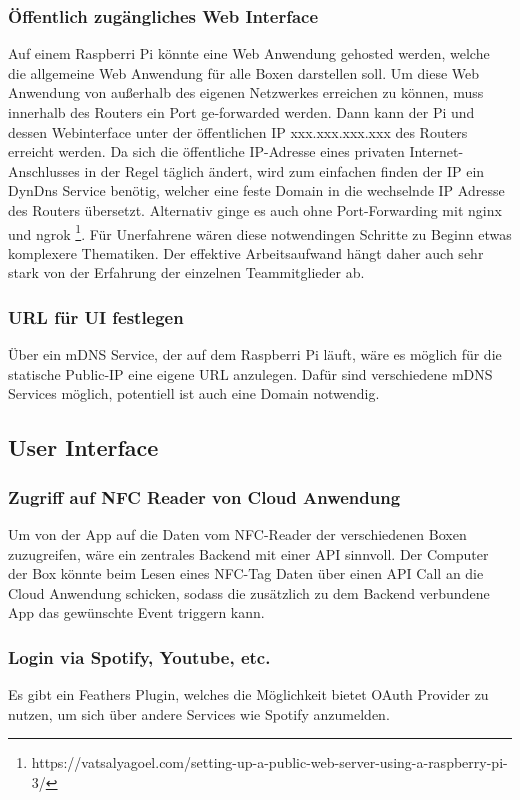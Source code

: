\documentclass[10pt, a4paper]{article}
\begin{document}
\subsubsection{Öffentlich zugängliches Web Interface}
Auf einem Raspberri Pi könnte eine Web Anwendung gehosted werden, welche die allgemeine Web Anwendung für alle Boxen darstellen soll.
Um diese Web Anwendung von außerhalb des eigenen Netzwerkes erreichen zu können, muss innerhalb des Routers ein Port ge-forwarded werden.
Dann kann der Pi und dessen Webinterface unter der öffentlichen IP xxx.xxx.xxx.xxx des Routers erreicht werden.
Da sich die öffentliche IP-Adresse eines privaten Internet-Anschlusses in der Regel täglich ändert, wird zum einfachen finden der IP ein DynDns Service benötig, welcher eine feste Domain in die wechselnde IP Adresse des Routers übersetzt.
Alternativ ginge es auch ohne Port-Forwarding mit nginx und ngrok \footnote{https://vatsalyagoel.com/setting-up-a-public-web-server-using-a-raspberry-pi-3/}.
Für Unerfahrene wären diese notwendingen Schritte zu Beginn etwas komplexere Thematiken. Der effektive Arbeitsaufwand hängt daher auch sehr stark von der Erfahrung der einzelnen Teammitglieder ab.

\subsubsection{URL für UI festlegen}
Über ein mDNS Service, der auf dem Raspberri Pi läuft, wäre es möglich für die statische Public-IP eine eigene URL anzulegen.
Dafür sind verschiedene mDNS Services möglich, potentiell ist auch eine Domain notwendig.

\subsection{User Interface}
\subsubsection{Zugriff auf NFC Reader von Cloud Anwendung}
Um von der App auf die Daten vom NFC-Reader der verschiedenen Boxen zuzugreifen, wäre ein zentrales Backend mit einer API sinnvoll.
Der Computer der Box könnte beim Lesen eines NFC-Tag Daten über einen API Call an die Cloud Anwendung schicken, sodass die zusätzlich zu dem Backend verbundene App das gewünschte Event triggern kann.

\subsubsection{Login via Spotify, Youtube, etc.}
Es gibt ein Feathers Plugin, welches die Möglichkeit bietet OAuth Provider zu nutzen, um sich über andere Services wie Spotify anzumelden.
\end{document}
